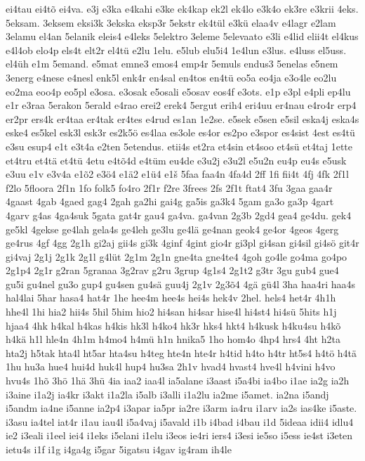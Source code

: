 {ei4tau
ei4tõ
ei4va.
e3j
e3ka
e4kahi
e3ke
ek4kap
ek2l
ek4lo
e3k4o
ek3re
e3krii
4eks.
5eksam.
3eksem
eksi3k
3ekska
eksp3r
5ekstr
ek4tül
e3kü
elaa4v
e4lagr
e2lam
3elamu
el4an
5elanik
eleis4
e4leks
5elektro
3eleme
5elevaato
e3li
e4lid
elii4t
el4kus
e4l4ob
elo4p
els4t
elt2r
el4tü
e2lu
1elu.
e5lub
elu5i4
1e4lun
e3lus.
e4luss
el5uss.
el4üh
e1m
5emand.
e5mat
emne3
emos4
emp4r
5emuls
endus3
5enelas
e5nem
3energ
e4nese
e4nesl
enk5l
enk4r
en4sal
en4tos
en4tü
eo5a
eo4ja
e3o4le
eo2lu
eo2ma
eoo4p
eo5pl
e3osa.
e3osak
e5osali
e5osav
eos4f
e3ots.
e1p
e3pl
e4pli
ep4lu
e1r
e3raa
5erakon
5erald
e4rao
erei2
erek4
5ergut
erih4
eri4uu
er4nau
e4ro4r
erp4
er2pr
ers4k
er4taa
er4tak
er4tes
e4rud
es1an
1e2se.
e5sek
e5sen
e5sil
eska4j
eska4s
eske4
es5kel
esk3l
esk3r
es2k5ö
es4laa
es3ole
es4or
es2po
e3spor
es4sist
4est
es4tü
e3su
esup4
e1t
e3t4a
e2ten
5etendus.
etii4s
et2ra
et4sin
et4soo
et4sü
et4taj
1ette
et4tru
et4tä
et4tü
4etu
e4tõ4d
e4tüm
eu4de
e3u2j
e3u2l
e5u2n
eu4p
eu4s
e5usk
e3uu
e1v
e3v4a
e1õ2
e3ö4
e1ä2
e1ü4
e1š
5faa
faa4n
4fa4d
2ff
1fi
fii4t
4fj
4fk
2f1l
f2lo
5floora
2f1n
1fo
folk5
fo4ro
2f1r
f2re
3frees
2fs
2f1t
ftat4
3fu
3gaa
gaa4r
4gaast
4gab
4gaed
gag4
2gah
ga2hi
gai4g
ga5is
ga3k4
5gam
ga3o
ga3p
4gart
4garv
g4as
4ga4suk
5gata
gat4r
gau4
ga4va.
ga4van
2g3b
2gd4
gea4
ge4du.
gek4
ge5kl
4gekse
ge4lah
gela4s
ge4leh
ge3lu
ge4lä
ge4nan
geok4
ge4or
4geos
4gerg
ge4rus
4gf
4gg
2g1h
gi2aj
gii4s
gi3k
4ginf
4gint
gio4r
gi3pl
gi4san
gi4sil
gi4sö
git4r
gi4vaj
2g1j
2g1k
2g1l
g4lüt
2g1m
2g1n
gne4ta
gne4te4
4goh
go4le
go4ma
go4po
2g1p4
2g1r
g2ran
5granaa
3g2rav
g2ru
3grup
4g1s4
2g1t2
g3tr
3gu
gub4
gue4
gu5i
gu4nel
gu3o
gup4
gu4sen
gu4sä
guu4j
2g1v
2g3õ4
4gä
gü4l
3ha
haa4ri
haa4s
hal4lai
5har
hasa4
hat4r
1he
hee4m
hee4s
hei4s
hek4v
2hel.
hels4
het4r
4h1h
hhe4l
1hi
hia2
hii4s
5hil
5him
hio2
hi4san
hi4sar
hise4l
hi4st4
hi4sü
5hits
h1j
hjaa4
4hk
h4kal
h4kas
h4kis
hk3l
h4ko4
hk3r
hks4
hkt4
h4kusk
h4ku4su
h4kõ
h4kä
h1l
hle4n
4h1m
h4mo4
h4mü
h1n
hnika5
1ho
hom4o
4hp4
hrs4
4ht
h2ta
hta2j
h5tak
hta4l
ht5ar
hta4su
h4teg
hte4n
hte4r
h4tid
h4to
h4tr
ht5s4
h4tö
h4tä
1hu
hu3a
hue4
hui4d
huk4l
hup4
hu3sa
2h1v
hvad4
hvast4
hve4l
h4vini
h4vo
hvu4s
1hõ
3hö
1hä
3hü
4ia
iaa2
iaa4l
ia5alane
i3aast
i5a4bi
ia4bo
i1ae
ia2g
ia2h
i3aine
i1a2j
ia4kr
i3akt
i1a2la
i5alb
i3alli
i1a2lu
ia2me
i5amet.
ia2na
i5andj
i5andm
ia4ne
i5anne
ia2p4
i3apar
ia5pr
ia2re
i3arm
ia4ru
i1arv
ia2s
ias4ke
i5aste.
i3asu
ia4tel
iat4r
i1au
iau4l
i5a4vaj
i5avald
i1b
i4bad
i4bau
i1d
5ideaa
idii4
idlu4
ie2
i3eali
i1eel
iei4
i1eks
i5elani
i1elu
i3eos
ie4ri
iers4
i3esi
ie5so
i5ess
ie4st
i3eten
ietu4s
i1f
i1g
i4ga4g
i5gar
5igatsu
i4gav
ig4ram
ih4le
}
